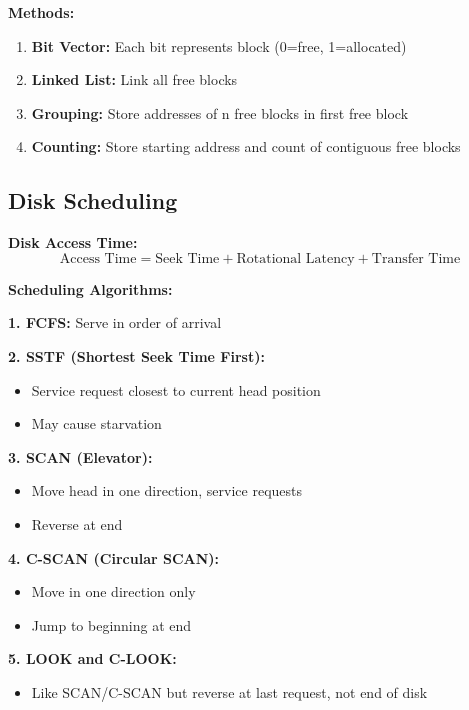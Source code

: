 \documentclass[11pt,a4paper]{article}
\begin{document}
\textbf{Methods:}
\begin{enumerate}
    \item \textbf{Bit Vector:} Each bit represents block (0=free, 1=allocated)
    \item \textbf{Linked List:} Link all free blocks
    \item \textbf{Grouping:} Store addresses of n free blocks in first free block
    \item \textbf{Counting:} Store starting address and count of contiguous free blocks
\end{enumerate}

\subsection{Disk Scheduling}

\textbf{Disk Access Time:}
\[
    \text{Access Time} = \text{Seek Time} + \text{Rotational Latency} + \text{Transfer Time}
\]

\textbf{Scheduling Algorithms:}

\textbf{1. FCFS:} Serve in order of arrival

\textbf{2. SSTF (Shortest Seek Time First):}
\begin{itemize}
    \item Service request closest to current head position
    \item May cause starvation
\end{itemize}

\textbf{3. SCAN (Elevator):}
\begin{itemize}
    \item Move head in one direction, service requests
    \item Reverse at end
\end{itemize}

\textbf{4. C-SCAN (Circular SCAN):}
\begin{itemize}
    \item Move in one direction only
    \item Jump to beginning at end
\end{itemize}

\textbf{5. LOOK and C-LOOK:}
\begin{itemize}
    \item Like SCAN/C-SCAN but reverse at last request, not end of disk
\end{itemize}

\end{document}
